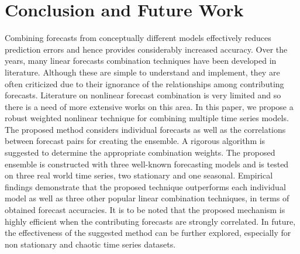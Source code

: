 \section{Conclusion and Future Work}

Combining forecasts from conceptually different models effectively reduces prediction errors and hence provides considerably increased accuracy. Over the years, many linear forecasts combination techniques have been developed in literature. Although these are simple to understand and implement, they are often criticized due to their ignorance of the relationships among contributing forecasts. Literature on nonlinear forecast combination is very limited and so there is a need of more extensive works on this area. In this paper, we propose a robust weighted nonlinear
technique for combining multiple time series models. The proposed method considers individual forecasts as well as the correlations between forecast pairs for creating the ensemble. A rigorous algorithm is suggested to determine the appropriate combination weights. The proposed ensemble is constructed with three well-known forecasting models and is tested on three real world time series, two stationary and one seasonal. Empirical findings demonstrate that the proposed technique outperforms each individual model as well as three other popular linear combination techniques, in terms of obtained forecast accuracies. It is to be noted that the proposed mechanism is highly efficient when the contributing forecasts are strongly correlated. In future, the effectiveness of the suggested method can be further explored, especially for non stationary and chaotic time series datasets. 
